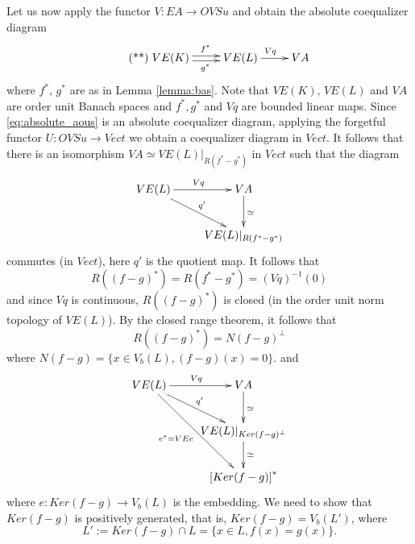 \documentclass[12pt]{article}
\begin{document}
Let us now apply the functor $V:EA\to OVSu$ and  obtain the absolute coequalizer diagram 
\begin{equation}\label{eq:absolute_aous}\tag{**}
\xymatrix{
VE(K) \ar@<.5ex>[r]^{f^*} \ar@<-.5ex>[r]_{g^*} &VE(L)\ar[r]^{Vq} & VA }
\end{equation}
where $f^*$, $g^*$ are as in Lemma \ref{lemma:bas}. Note that $VE(K)$, $VE(L)$ and $VA$ are order unit Banach spaces and $f^*,g^*$ and $Vq$ are bounded linear maps.
 Since  \eqref{eq:absolute_aous} is an absolute coequalizer diagram, applying the forgetful functor $U: OVSu\to Vect$ we obtain a coequalizer diagram in $Vect$. It follows that there is an isomorphism $VA\simeq VE(L)|_{R(f^*-g^*)}$ in $Vect$ such that the diagram
\[
\xymatrix{VE(L)\ar[r]^{Vq} \ar[rd]^{q'}& VA \ar[d]^{\simeq} \\  & VE(L)|_{R(f^*-g^*)}} 
\] 
commutes (in $Vect$), here $q'$ is the quotient map. It follows that 
\[
R((f-g)^*)=R(f^*-g^*)=(Vq)^{-1}(0)
\]
 and since $Vq$ is continuous, $R((f-g)^*)$ is closed (in the order unit norm topology of $VE(L)$). By the closed range theorem, it follows that
\[ 
R((f-g)^*)=N(f-g)^\perp
\]
where $N(f-g)=\{x\in V_b(L), (f-g)(x)=0\}$.
 and
\[
\xymatrix{VE(L)\ar[r]^{Vq} \ar[rd]^{q'} \ar[rdd]_{e^*=VEe}& VA \ar[d]^{\simeq} \\  & VE(L)|_{Ker(f-g)^\perp}\ar[d]^\simeq \\
& \left[Ker(f-g)\right]^*}
\]
where $e: Ker(f-g)\to V_b(L)$ is the embedding. We need to show that $Ker(f-g)$ is positively generated, that is, 
$Ker(f-g)=V_b(L')$, where 
\[
L':=Ker(f-g)\cap L=\{x\in L, f(x)=g(x)\}.
\]




 
\end{document}
